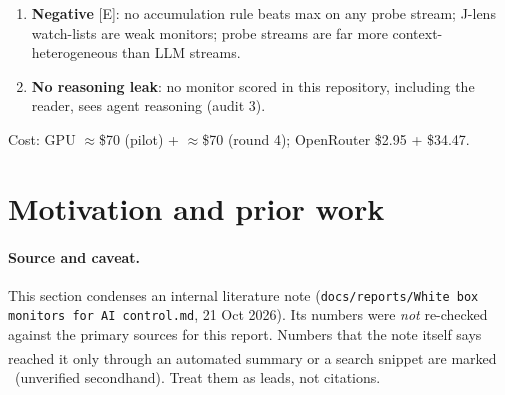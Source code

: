 \documentclass[11pt]{article}
\newcommand{\tE}{\textsf{\scriptsize\textcolor{ink2}{[E]}}\xspace}
\newcommand{\uv}{\textsuperscript{\dag}}
\begin{document}
{\begin{enumerate}[leftmargin=1.2em]
\item \textbf{Negative} \tE: no accumulation rule beats max on any probe stream; J-lens watch-lists are weak monitors; probe streams are far more context-heterogeneous than LLM streams.
\item \textbf{No reasoning leak}: no monitor scored in this repository, including the reader, sees agent reasoning (audit 3).
\end{enumerate}
Cost: GPU $\approx$\$70 (pilot) + $\approx$\$70 (round 4); OpenRouter \$2.95 + \$34.47.}


\section{Motivation and prior work}\label{sec:prior}

\paragraph{Source and caveat.} This section condenses an internal literature note (\nolinkurl{docs/reports/White box monitors for AI control.md}, 21 Oct 2026). Its numbers were \emph{not} re-checked against the primary sources for this report. Numbers that the note itself says reached it only through an automated summary or a search snippet are marked \uv\ (unverified secondhand). Treat them as leads, not citations.
\end{document}
